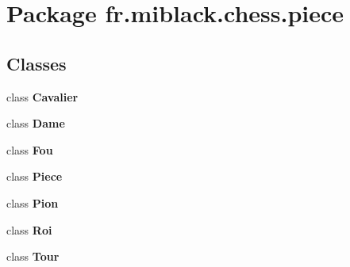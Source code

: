 \section{Package fr.\-miblack.\-chess.\-piece}
\label{namespacefr_1_1miblack_1_1chess_1_1piece}
\subsection*{Classes}
\begin{DoxyCompactItemize}
\item 
class {\bf Cavalier}
\item 
class {\bf Dame}
\item 
class {\bf Fou}
\item 
class {\bf Piece}
\item 
class {\bf Pion}
\item 
class {\bf Roi}
\item 
class {\bf Tour}
\end{DoxyCompactItemize}
